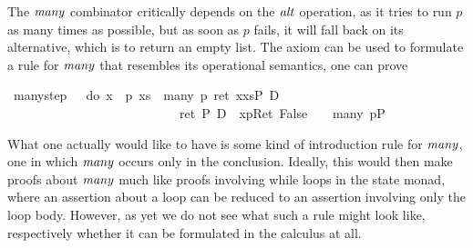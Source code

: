 The $\mathit{many}$ combinator critically depends on the $\mathit{alt}$
operation, as it tries to run $p$ as many times as possible, but as soon as $p$
fails, it will fall back on its alternative, which is to return an empty list.
The axiom  can be used to formulate a rule for $\mathit{many}$
that resembles its operational semantics, \IE one can prove
\begin{isabellebody}
\isanewline
{}\ many{\isacharunderscore}step{\isacharcolon}\ {\isachardoublequote}{\isasymlbrakk}\ {\isasymturnstile}\ {\isasymlangle}{\isacharparenleft}do\ {\isacharbraceleft}x\ {\isasymleftarrow}\ p{\isacharsemicolon}\ xs\ {\isasymleftarrow}\ many\ p{\isacharsemicolon}\ ret\ {\isacharparenleft}x{\isacharhash}xs{\isacharparenright}{\isacharbraceright}{\isacharparenright}{\isasymrangle}P\ {\isasymor}\isactrlsub D\ \isanewline
\ \ \ \ \ \ \ \ \ \ \ \ \ \ \ \ \ \ \ \ \ \ \ \ \ \ \ {\isasymlangle}ret\ {\isacharbrackleft}{\isacharbrackright}{\isasymrangle}P\ {\isasymand}\isactrlsub D\ {\isacharbrackleft}{\isacharhash}\ x{\isasymleftarrow}p{\isacharbrackright}{\isacharparenleft}Ret\ False{\isacharparenright}\ {\isasymrbrakk}\ {\isasymLongrightarrow}\ {\isasymturnstile}\ {\isasymlangle}many\ p{\isasymrangle}P{\isachardoublequote}\isanewline
\end{isabellebody}
What one actually would like to have is some kind of introduction rule for
$\mathit{many}$, \IE one in which $\mathit{many}$ occurs only in the conclusion. Ideally,
this would then make proofs about $\mathit{many}$ much like proofs involving while loops in
the state monad, where an assertion about a loop can be reduced to an assertion
involving only the loop body. However, as yet we do not see what such a rule
might look like, respectively whether it can be formulated in the calculus at
all. 

